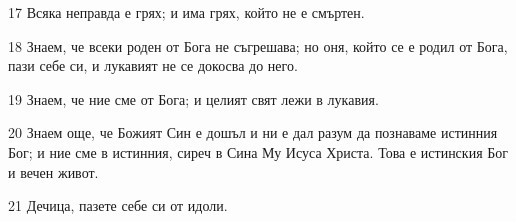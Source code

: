 \par 17 Всяка неправда е грях; и има грях, който не е смъртен.
\par 18 Знаем, че всеки роден от Бога не съгрешава; но оня, който се е родил от Бога, пази себе си, и лукавият не се докосва до него.
\par 19 Знаем, че ние сме от Бога; и целият свят лежи в лукавия.
\par 20 Знаем още, че Божият Син е дошъл и ни е дал разум да познаваме истинния Бог; и ние сме в истинния, сиреч в Сина Му Исуса Христа. Това е истинския Бог и вечен живот.
\par 21 Дечица, пазете себе си от идоли.

